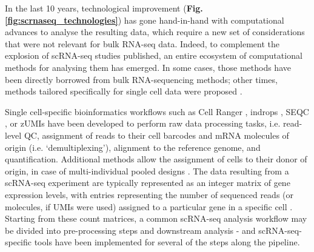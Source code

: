 In the last 10 years, technological improvement (\textbf{Fig. \ref{fig:scrnaseq_technologies}}) has gone hand-in-hand with computational advances to analyse the resulting data, which require a new set of considerations that were not relevant for bulk RNA-seq data.
Indeed, to complement the explosion of scRNA-seq studies published, an entire ecosystem of computational methods for analysing them has emerged.
In some cases, those methods have been directly borrowed from bulk RNA-sequencing methods; other times, methods tailored specifically for single cell data were proposed \cite{stegle2015computational, zappia2018exploring, luecken2019current}.

\clearpage

Single cell-specific bioinformatics workflows such as Cell Ranger \cite{zheng2017massively}, indrops \cite{klein2015droplet}, SEQC  \cite{azizi2018single}, or zUMIs \cite{parekh2018zumis}
have been developed to perform 
raw data processing tasks,
i.e. read-level QC, assignment of reads to their cell barcodes and mRNA molecules of origin (i.e. `demultiplexing'), alignment to the reference genome, and quantification. 
Additional methods allow the assignment of cells to their donor of origin, in case of  multi-individual pooled designs \cite{kang2018multiplexed, mccarthy2020cardelino}.
The data resulting from a scRNA-seq experiment are typically represented as an integer matrix of gene expression levels, with entries representing the number of sequenced reads (or molecules, if UMIs were used) assigned to a particular gene in a specific cell \cite{griffiths2018using}.
Starting from these count matrices, a common scRNA-seq analysis workflow may be divided into pre-processing steps and downstream analysis \cite{luecken2019current} - and scRNA-seq-specific tools have been implemented for several of the steps along the pipeline.\\

